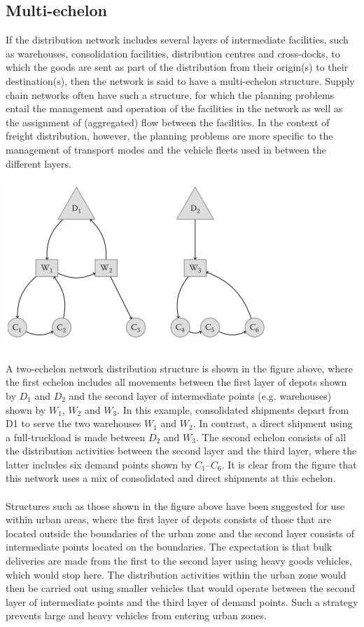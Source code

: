 \subsection{Multi-echelon}
If the distribution network includes several layers of intermediate facilities, such as warehouses, consolidation facilities, distribution centres and cross-docks, to which the goods are sent as part of the distribution from their origin(s) to their destination(s), then the network is said to have a multi-echelon structure. Supply chain networks often have such a structure, for which the planning problems entail the management and operation of the facilities in the network as well as the assignment of (aggregated) flow between the facilities. In the context of freight distribution, however, the planning problems are more specific to the management of transport modes and the vehicle fleets used in between the different layers.
\begin{center}
	\includegraphics{gfx/fig37.png}
\end{center}
A two-echelon network distribution structure is shown in the figure above, where the first echelon includes all movements between the first layer of depots shown by $ D_1 $ and $ D_2 $ and the second layer of intermediate points (e.g. warehouses) shown by $ W_1 $, $ W_2 $ and $ W_3 $. In this example, consolidated shipments depart from D1 to serve the two warehouses $ W_1 $ and $ W_2 $. In contrast, a direct shipment using a full-truckload is made between $ D_2 $ and $ W_3 $. The second echelon consists of all the distribution activities between the second layer and the third layer, where the latter includes six demand points shown by $ C_1–C_6 $. It is clear from the figure that this network uses a mix of consolidated and direct shipments at this echelon.
\paragraph{}
Structures such as those shown in the figure above have been suggested for use
within urban areas, where the first layer of depots consists of those that are located outside the boundaries of the urban zone and the second layer consists of intermediate points located on the boundaries. The expectation is that bulk deliveries are made from the first to the second layer using heavy goods vehicles, which would stop here. The distribution activities within the urban zone would then be carried out using smaller vehicles that would operate between the second layer of intermediate points and the third layer of demand points. Such a strategy prevents large and heavy vehicles from entering urban zones.
%
